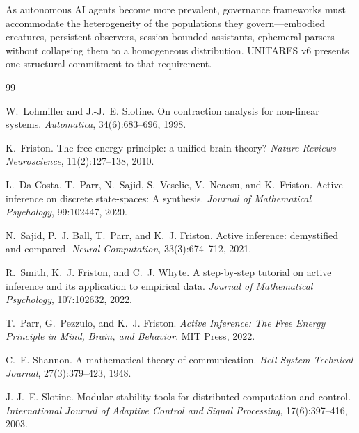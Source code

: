 \documentclass[11pt,twocolumn]{article}
\begin{document}
As autonomous AI agents become more prevalent, governance
frameworks must accommodate the heterogeneity of the populations
they govern---embodied creatures, persistent observers,
session-bounded assistants, ephemeral parsers---without
collapsing them to a homogeneous distribution. UNITARES v6
presents one structural commitment to that requirement.




\begin{thebibliography}{99}

W.~Lohmiller and J.-J.~E. Slotine.
\newblock On contraction analysis for non-linear systems.
\newblock \emph{Automatica}, 34(6):683--696, 1998.

K.~Friston.
\newblock The free-energy principle: a unified brain theory?
\newblock \emph{Nature Reviews Neuroscience}, 11(2):127--138, 2010.

L.~Da Costa, T.~Parr, N.~Sajid, S.~Veselic, V.~Neacsu, and K.~Friston.
\newblock Active inference on discrete state-spaces: A synthesis.
\newblock \emph{Journal of Mathematical Psychology}, 99:102447, 2020.

N.~Sajid, P.~J. Ball, T.~Parr, and K.~J. Friston.
\newblock Active inference: demystified and compared.
\newblock \emph{Neural Computation}, 33(3):674--712, 2021.

R.~Smith, K.~J. Friston, and C.~J. Whyte.
\newblock A step-by-step tutorial on active inference and its application to empirical data.
\newblock \emph{Journal of Mathematical Psychology}, 107:102632, 2022.

T.~Parr, G.~Pezzulo, and K.~J. Friston.
\newblock \emph{Active Inference: The Free Energy Principle in Mind, Brain, and Behavior}.
\newblock MIT Press, 2022.

C.~E. Shannon.
\newblock A mathematical theory of communication.
\newblock \emph{Bell System Technical Journal}, 27(3):379--423, 1948.

J.-J.~E. Slotine.
\newblock Modular stability tools for distributed computation and control.
\newblock \emph{International Journal of Adaptive Control and Signal Processing},
  17(6):397--416, 2003.


\end{thebibliography}
\end{document}
